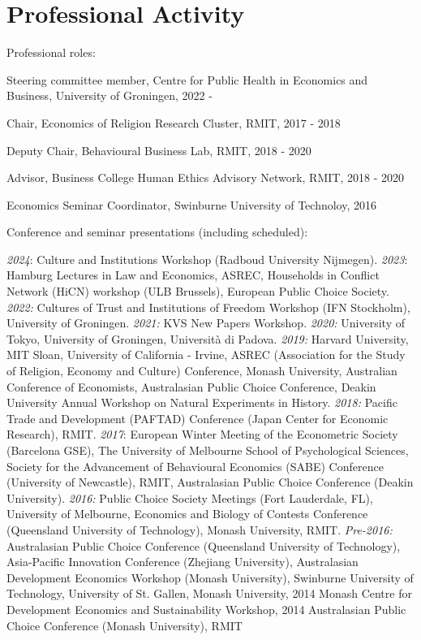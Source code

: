 \documentclass[letterpaper]{article}
\renewenvironment{itemize}{
  \begin{list}{}{
    \setlength{\leftmargin}{1.5em}
  }
}{
  \end{list}
}
\begin{document}
\section*{Professional Activity}
\begin{itemize}
	
		\item Professional roles:
	\begin{itemize}
			\item Steering committee member, Centre for Public Health in Economics and Business, University of Groningen, 2022 -
		\item Chair, Economics of Religion Research Cluster, RMIT, 2017 - 2018
		\item  Deputy Chair, Behavioural Business Lab, RMIT, 2018 - 2020
		\item Advisor, Business College Human Ethics Advisory Network, RMIT, 2018 - 2020
		\item Economics Seminar Coordinator, Swinburne University of Technoloy, 2016
	\end{itemize}


	\item Conference and seminar presentations (including scheduled):
	\begin{itemize}
		\item \textit{2024}: Culture and Institutions Workshop (Radboud University Nijmegen). \textit{2023}: Hamburg Lectures in Law and Economics, ASREC, Households in Conflict Network (HiCN) workshop (ULB Brussels), European Public Choice Society. \textit{2022:}  Cultures of Trust and Institutions of Freedom Workshop (IFN Stockholm), University of Groningen. \textit{2021:} KVS New Papers Workshop. \textit{2020:} University of Tokyo, University of Groningen, Università di Padova. \textit{2019:} Harvard University, MIT Sloan, University of California - Irvine, ASREC (Association for the Study of Religion, Economy and Culture) Conference, Monash University, Australian Conference of Economists, Australasian Public Choice Conference, Deakin University Annual Workshop on Natural Experiments in History.  \textit{2018:} Pacific Trade and Development (PAFTAD) Conference (Japan Center for Economic Research), RMIT. \textit{2017}: European Winter Meeting of the Econometric Society (Barcelona GSE), The University of Melbourne School of Psychological Sciences, Society for the Advancement of Behavioural Economics (SABE) Conference (University of Newcastle), RMIT, Australasian Public Choice Conference (Deakin University). \textit{2016:} Public Choice Society Meetings (Fort Lauderdale, FL), University of Melbourne, Economics and Biology of Contests Conference (Queensland University of Technology), Monash University, RMIT. \textit{Pre-2016: }Australasian Public Choice Conference (Queensland University of Technology), Asia-Pacific Innovation Conference (Zhejiang University), Australasian Development Economics Workshop (Monash University), Swinburne University of Technology, University of St. Gallen, Monash University, 2014 Monash Centre for Development Economics and Sustainability Workshop, 2014 Australasian Public Choice Conference (Monash University), RMIT
	\end{itemize}
	

\end{itemize}
\end{document}
